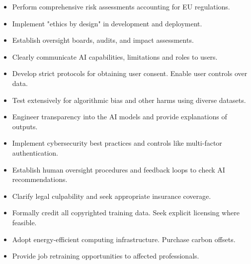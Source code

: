 \begin{itemize}
\item Perform comprehensive risk assessments accounting for EU regulations.

\item Implement "ethics by design" in development and deployment.

\item Establish oversight boards, audits, and impact assessments.

\item Clearly communicate AI capabilities, limitations and roles to users.

\item Develop strict protocols for obtaining user consent. Enable user controls over data.

\item Test extensively for algorithmic bias and other harms using diverse datasets.

\item Engineer transparency into the AI models and provide explanations of outputs.

\item Implement cybersecurity best practices and controls like multi-factor authentication.

\item Establish human oversight procedures and feedback loops to check AI recommendations.

\item Clarify legal culpability and seek appropriate insurance coverage.

\item Formally credit all copyrighted training data. Seek explicit licensing where feasible.

\item Adopt energy-efficient computing infrastructure. Purchase carbon offsets.

\item Provide job retraining opportunities to affected professionals.
\end{itemize}



